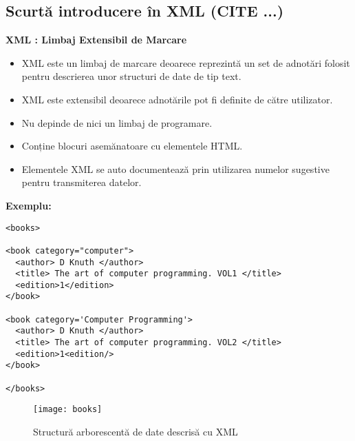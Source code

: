 \subsection{Scurtă introducere în XML (CITE ...)} 
\textbf{XML : Limbaj Extensibil de Marcare}
\begin{itemize}
\item XML este un limbaj de marcare deoarece reprezintă un set de adnotări folosit pentru descrierea unor structuri de date de tip text.
\item XML este extensibil deoarece adnotările pot fi definite de către utilizator.
\item Nu depinde de nici un limbaj de programare.
\item Conține blocuri asemănatoare cu elementele HTML.
\item Elementele XML se auto documentează prin utilizarea numelor sugestive pentru transmiterea datelor.
\end{itemize}
\par \textbf{ Exemplu: }
\begin{verbatim}
<books>

<book category="computer">
  <author> D Knuth </author>
  <title> The art of computer programming. VOL1 </title>
  <edition>1</edition>
</book>

<book category='Computer Programming'>
  <author> D Knuth </author>
  <title> The art of computer programming. VOL2 </title>
  <edition>1<edition/>
</book>

</books>
\end{verbatim}

\begin{figure}[h]
    \centering
    \texttt{[image: books]}
    \caption{Structură arborescentă de date descrisă cu XML}
    \label{fig:imag6}
\end{figure}

